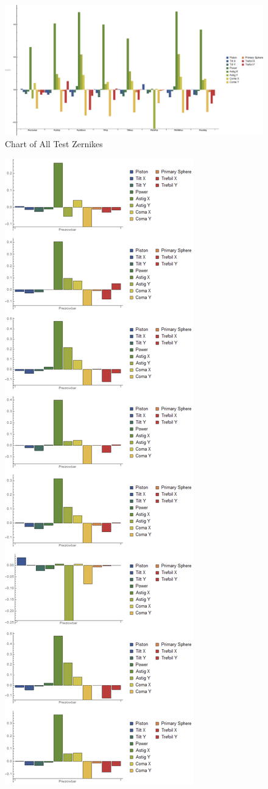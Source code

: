 \documentclass{article}
\begin{document}
\begin{figure}[h!]
\includegraphics[width=.8\linewidth]{GraphData_IndividualTests_minusref2.eps}
\caption{Chart of All Test Zernikes}
\label{minrefgraph}
\end{figure}
\begin{figure}
\includegraphics[scale=0.25]{GraphData_IndividualTests_minusref2}

\end{figure}
\end{document}

